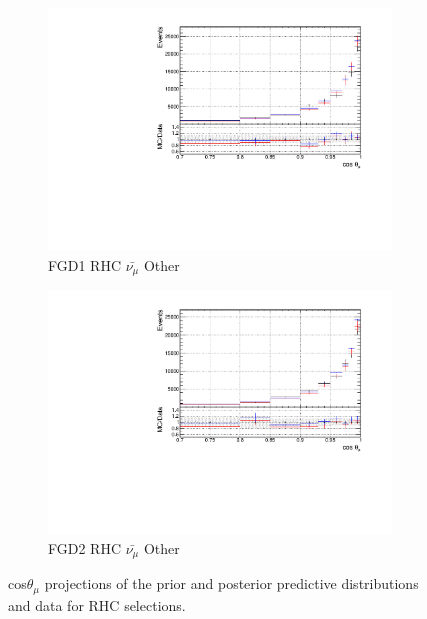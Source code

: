 \begin{figure}[!htbp]
\begin{subfigure}{0.49\textwidth}
  \centering
  \includegraphics[width=\textwidth]{figs/priorpred1D_t_FGD1_anti-numuCC_other}
  \caption{FGD1 RHC $\bar{\nu_{\mu}}$ Other}
\end{subfigure}
\begin{subfigure}{0.49\textwidth}
  \centering
  \includegraphics[width=\textwidth]{figs/priorpred1D_t_FGD2_anti-numuCC_other}
  \caption{FGD2 RHC $\bar{\nu_{\mu}}$ Other}
\end{subfigure}
\caption{cos$\theta_{\mu}$ projections of the prior and posterior predictive distributions and data for RHC \numub selections.}
\label{fig:priorpost_rhc_numub_t}
\end{figure}

